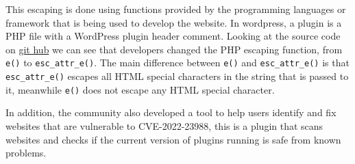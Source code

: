 \documentclass{article}
\begin{document}
	This escaping is done using functions provided by the programming languages or framework that is being used to develop the website. In wordpress, a plugin is a PHP file with a WordPress plugin header comment. Looking at the source code on \href{https://github.com/WordPress/WordPress/commit/948a260e805f11709cd38bf305a3092070ec7f66}{git hub} we can see that developers changed the PHP escaping function, from \verb|e()| to \verb|esc_attr_e()|. The main difference between \verb|e()| and \verb|esc_attr_e()| is that \verb|esc_attr_e()| escapes all HTML special characters in the string that is passed to it, meanwhile \verb|e()| does not escape any HTML special character.
	
	In addition, the community also developed a tool to help users identify and fix websites that are vulnerable to CVE-2022-23988, this is a plugin that scans websites and checks if the current version of plugins running is safe from known problems. 
\end{document}

